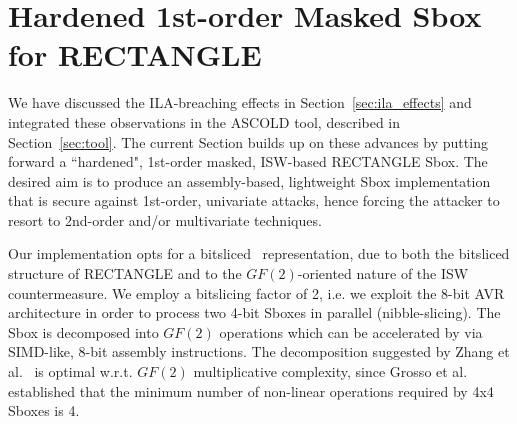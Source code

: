 \section{Hardened 1st-order Masked Sbox for RECTANGLE}\label{sec:rectangle}


We have discussed the ILA-breaching effects in Section~\ref{sec:ila_effects} 
and integrated these observations in the ASCOLD tool, described in Section~\ref{sec:tool}. 
The current Section builds up on these advances by putting forward a ``hardened", 
1st-order masked, ISW-based RECTANGLE Sbox. The desired aim is to produce an assembly-based, 
lightweight Sbox implementation that is secure against 1st-order, univariate attacks, 
hence forcing the attacker to resort to 2nd-order and/or multivariate techniques. 

Our implementation opts for a bitsliced~\cite{DBLP:conf/fse/DaemenGV93,DBLP:conf/fse/Biham97a} representation, due to both the bitsliced structure of RECTANGLE and to the $GF(2)$-oriented nature of the ISW countermeasure. We employ a bitslicing factor of 2, i.e. we exploit the 8-bit AVR architecture in order to process two 4-bit Sboxes in parallel (nibble-slicing). The Sbox is decomposed into $GF(2)$ operations which can be accelerated by via SIMD-like, 8-bit assembly instructions. The decomposition suggested by Zhang et al.~\cite{DBLP:journals/chinaf/ZhangBLR0V15} is optimal w.r.t. $GF(2)$ multiplicative complexity, since Grosso et al.~\cite{DBLP:conf/fse/GrossoLSV14} established that the minimum number of non-linear operations required by 4x4 Sboxes is 4. 

